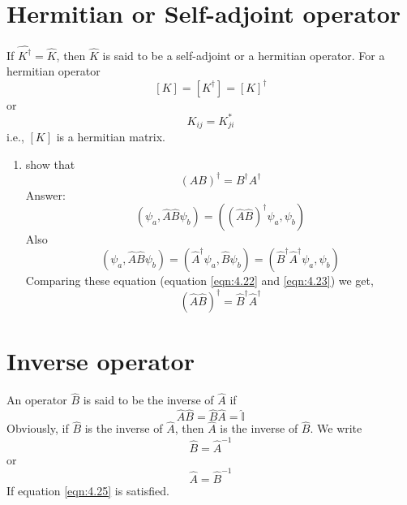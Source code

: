 \section{Hermitian or Self-adjoint operator}
If $\hat{K^\dagger} = \hat{K}$, then $\hat{K}$ is said to be a self-adjoint or a hermitian operator. For a hermitian operator
\begin{equation}\label{eqn:4.19}
\left[K\right] = \left[K^\dagger\right] = \left[K\right]^\dagger
\end{equation}
or
\begin{equation}\label{eqn:4.20}
K_{i j} = K_{j i}^*
\end{equation}
i.e., $\left[K\right]$ is a hermitian matrix.
\begin{enumerate}[label=\textbf{Example \arabic*},start=1]
	\item 
	show that
	\begin{equation}\label{eqn:4.21}
	\left(A B\right)^\dagger = B^\dagger A^\dagger
	\end{equation}
	Answer: \\
	\begin{equation}\label{eqn:4.22}
	\left(\psi_a, \hat{A}\hat{B}\psi_b\right) = \left(\left(  \hat{A}\hat{B}\right)^\dagger\psi_a, \psi_b \right)
	\end{equation}
	Also
	\begin{equation}\label{eqn:4.23}
	\left(\psi_a, \hat{A}\hat{B}\psi_b\right) = \left(  \hat{A}^\dagger\psi_a, \hat{B}\psi_b \right) = \left(  \hat{B}^\dagger\hat{A}^\dagger\psi_a, \psi_b \right)
	\end{equation}
	Comparing these equation (equation \ref{eqn:4.22} and \ref{eqn:4.23}) we get,
	\begin{equation}\label{eqn:4.24}
	\left(\hat{A}\hat{B}\right)^\dagger = \hat{B}^\dagger \hat{A}^\dagger
	\end{equation}
\end{enumerate}
\section{Inverse operator}
An operator $\hat{B}$ is said to be the inverse of $\hat{A}$ if
\begin{equation}\label{eqn:4.25}
\hat{A}\hat{B} = \hat{B}\hat{A} = \hat{\mathbb{I}}
\end{equation}
Obviously, if $\hat{B}$ is the inverse of $\hat{A}$, then $\hat{A}$ is the inverse of $\hat{B}$. We write
\begin{equation}\label{eqn:4.26}
\hat{B} = \hat{A} ^{-1}
\end{equation}
or
\begin{equation}\label{eqn:4.27}
\hat{A} = \hat{B} ^{-1}
\end{equation}
If equation \ref{eqn:4.25} is satisfied.

